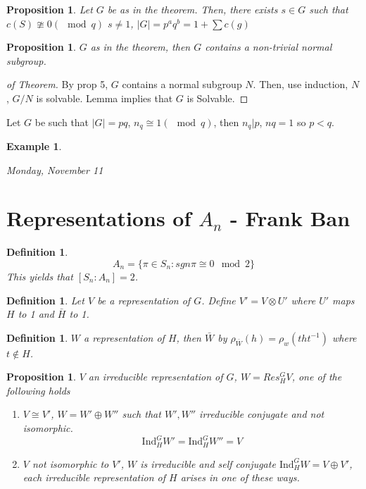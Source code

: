 \documentclass[letterpaper, leqno, 12pt]{article}
\newcommand{\fin}{\qquad \quad \hfill \framebox[1.75mm][l]{\,}}
\newcommand{\Ind}{\mbox{Ind}}
\theoremstyle{stdthm}
\newtheorem{prop}[thm]{Proposition}
\theoremstyle{stddef}
\newtheorem{defn}[thm]{Definition}
\newtheorem{eg}[thm]{Example} %
\theoremstyle{stdnonum}
\theoremstyle{stdqands}
\theoremstyle{stdbold}
\begin{document}
\begin{prop}
Let $G$ be as in the theorem. Then, there exists $s \in G$ such that $c(S) \ncong 0 (\mod q)$ $s \neq 1$, $|G| = p^a q^b=1 + \sum c(g)$
\end{prop}

\begin{prop}
$G$ as in the theorem, then $G$ contains a non-trivial normal subgroup. 
\end{prop}

\begin{proof}[of Theorem]
By prop 5, $G$ contains a normal subgroup $N$. Then, use induction, $N$, $G/N$ is solvable. Lemma implies that $G$ is Solvable. 
\end{proof}

Let $G$ be such that $|G| = pq$, $n_q \cong 1 (\mod q)$, then $n_q|p$, $nq = 1$ so $p <q$. 

\begin{eg}

\end{eg}

\begin{center}
\emph{Monday, November 11}
\end{center}

\section*{Representations of $A_n$ - Frank Ban}
\begin{defn}
\[ A_n = \{ \pi \in S_n: sgn \pi \cong 0 \mod 2\}\]
This yields that $[S_n : A_n] = 2$. 
\end{defn}

\begin{defn}
Let $V$ be a representation of $G$. Define $V' = V \otimes U'$ where $U'$ maps $H$ to 1 and $\bar{H}$ to 1. 
\end{defn}

\begin{defn}
$W$ a representation of $H$, then $\bar{W}$ by $\rho_{\bar{W}}(h) = \rho_w(tht^{-1})$ where $t \notin H$. 
\end{defn}

\begin{prop}
$V$ an irreducible representation of $G$, $W = Res_H^G V$, one of the following holds
\begin{enumerate}
\item $V \cong V'$, $W = W'\oplus W''$ such that $W',W''$ irreducible conjugate and not isomorphic. 
\[ \Ind_H^G W' = \Ind_H^G W'' = V \]
\item $V$ not isomorphic to $V'$, $W$ is irreducible and self conjugate $\Ind_H^G W = V \oplus V'$, each irreducible representation of $H$ arises in one of these ways. 
\end{enumerate}
\end{prop}
\end{document}
